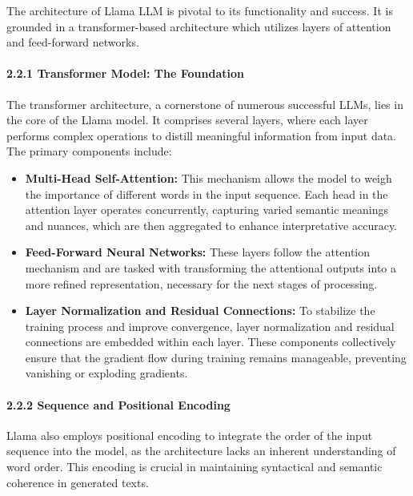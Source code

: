 The architecture of Llama LLM is pivotal to its functionality and
success. It is grounded in a transformer-based architecture which
utilizes layers of attention and feed-forward networks.

\hypertarget{transformer-model-the-foundation}{%
\paragraph{2.2.1 Transformer Model: The
Foundation}\label{transformer-model-the-foundation}}

The transformer architecture, a cornerstone of numerous successful LLMs,
lies in the core of the Llama model. It comprises several layers, where
each layer performs complex operations to distill meaningful information
from input data. The primary components include:

\begin{itemize}
\item
  \textbf{Multi-Head Self-Attention:} This mechanism allows the model to
  weigh the importance of different words in the input sequence. Each
  head in the attention layer operates concurrently, capturing varied
  semantic meanings and nuances, which are then aggregated to enhance
  interpretative accuracy.
\item
  \textbf{Feed-Forward Neural Networks:} These layers follow the
  attention mechanism and are tasked with transforming the attentional
  outputs into a more refined representation, necessary for the next
  stages of processing.
\item
  \textbf{Layer Normalization and Residual Connections:} To stabilize
  the training process and improve convergence, layer normalization and
  residual connections are embedded within each layer. These components
  collectively ensure that the gradient flow during training remains
  manageable, preventing vanishing or exploding gradients.
\end{itemize}

\hypertarget{sequence-and-positional-encoding}{%
\paragraph{2.2.2 Sequence and Positional
Encoding}\label{sequence-and-positional-encoding}}

Llama also employs positional encoding to integrate the order of the
input sequence into the model, as the architecture lacks an inherent
understanding of word order. This encoding is crucial in maintaining
syntactical and semantic coherence in generated texts.

